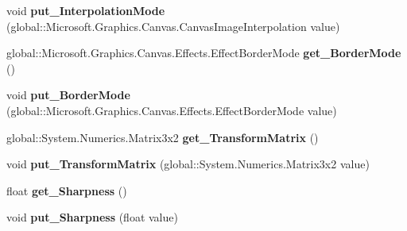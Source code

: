 \begin{DoxyCompactItemize}
void {\bfseries put\+\_\+\+Interpolation\+Mode} (global\+::\+Microsoft.\+Graphics.\+Canvas.\+Canvas\+Image\+Interpolation value)
\item 
\mbox{\label{class_microsoft_1_1_graphics_1_1_canvas_1_1_effects_1_1_transform2_d_effect_aba647ac3b58290db44c3c98ca8c19749}} 
global\+::\+Microsoft.\+Graphics.\+Canvas.\+Effects.\+Effect\+Border\+Mode {\bfseries get\+\_\+\+Border\+Mode} ()
\item 
\mbox{\label{class_microsoft_1_1_graphics_1_1_canvas_1_1_effects_1_1_transform2_d_effect_a3c44e6817302d293e5cd76726375a5e1}} 
void {\bfseries put\+\_\+\+Border\+Mode} (global\+::\+Microsoft.\+Graphics.\+Canvas.\+Effects.\+Effect\+Border\+Mode value)
\item 
\mbox{\label{class_microsoft_1_1_graphics_1_1_canvas_1_1_effects_1_1_transform2_d_effect_ac3153a849025ced8b89361d97104772b}} 
global\+::\+System.\+Numerics.\+Matrix3x2 {\bfseries get\+\_\+\+Transform\+Matrix} ()
\item 
\mbox{\label{class_microsoft_1_1_graphics_1_1_canvas_1_1_effects_1_1_transform2_d_effect_ab2dc992da27919ab922f3015532abe68}} 
void {\bfseries put\+\_\+\+Transform\+Matrix} (global\+::\+System.\+Numerics.\+Matrix3x2 value)
\item 
\mbox{\label{class_microsoft_1_1_graphics_1_1_canvas_1_1_effects_1_1_transform2_d_effect_aa820a4ea7ef6fe6bb2d75e16c55e2d44}} 
float {\bfseries get\+\_\+\+Sharpness} ()
\item 
\mbox{\label{class_microsoft_1_1_graphics_1_1_canvas_1_1_effects_1_1_transform2_d_effect_af157b24374215992f857b4060fe2ed79}} 
void {\bfseries put\+\_\+\+Sharpness} (float value)
\item 
\mbox{\label{class_microsoft_1_1_graphics_1_1_canvas_1_1_effects_1_1_transform2_d_effect_af35c6e93668e25c4c57cbcbce7286516}} 

\end{DoxyCompactItemize}
